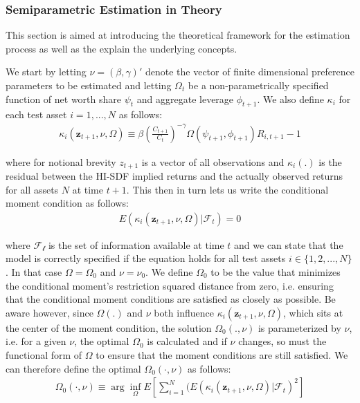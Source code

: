 \documentclass[12pt,a4paper]{article}
\begin{document}
		
		
		\subsubsection{Semiparametric Estimation in Theory}
		
		This section is aimed at introducing the theoretical framework for the estimation process as well as the explain the underlying concepts. 		
		
		We start by letting $\nu = (\beta, \gamma)'$ denote the vector of finite dimensional preference parameters to be estimated and letting $\Omega_t$ be a non-parametrically specified function of net worth share $\psi_{t}$ and aggregate leverage $\phi_{t+1}$. 
		We also define $\kappa_i$ for each test asset $i = 1, ..., N$ as follows:
		\begin{align}
			\kappa_i(\textbf{z}_{t+1}, \nu, \Omega)    \equiv  \beta \left( \frac{C_{t+1}}{C_t} \right)^{-\gamma}  \Omega(\psi_{t+1}, \phi_{t+1}) R_{i, t+1} - 1
			\label{eq:kappa_i}
		\end{align}
		
		where for notional brevity $z_{t+1}$ is a vector of all observations and $\kappa_i(.)$ is the residual between the HI-SDF implied returns and the actually observed returns for all assets $N$ at time $t+1$. This then in turn lets us write the conditional moment condition as follows:
		\begin{align}
			E(\kappa_i(\textbf{z}_{t+1}, \nu, \Omega) | \mathcal{F}_t) = 0 
			\label{eq:model_correctly_specified}
		\end{align}
		
		where $\mathcal{F_t}$ is the set of information available at time $t$ and we can state that the model is correctly specified if the equation holds for all test assets $i \in \{ 1,2,...,N \}$. In that case $\Omega = \Omega_0$ and $\nu = \nu_0$. 
		We define $\Omega_0$ to be the value that minimizes the conditional moment's restriction squared distance from zero, i.e. ensuring that the conditional moment conditions are satisfied as closely as possible. Be aware however, since $\Omega(.)$ and $\nu$ both influence $\kappa_i(\textbf{z}_{t+1}, \nu, \Omega)$, which sits at the center of the moment condition, the solution $\Omega_0(., \nu)$ is parameterized by $\nu$, i.e. for a given $\nu$, the optimal $\Omega_0$ is calculated and if $\nu$ changes, so must the functional form of $\Omega$ to ensure that the moment conditions are still satisfied. 
		We can therefore define the optimal $\Omega_0(\cdot,\nu)$ as follows: 
		\begin{align}
			\Omega_0(\cdot, \nu) \equiv \arg \underset{\Omega}\inf  E \left[ \sum_{i = 1}^{N} (	E(\kappa_i(\textbf{z}_{t+1}, \nu, \Omega) | \mathcal{F}_t)^2 \right]
			\label{eq:omega_0}
		\end{align}
		
\end{document}
